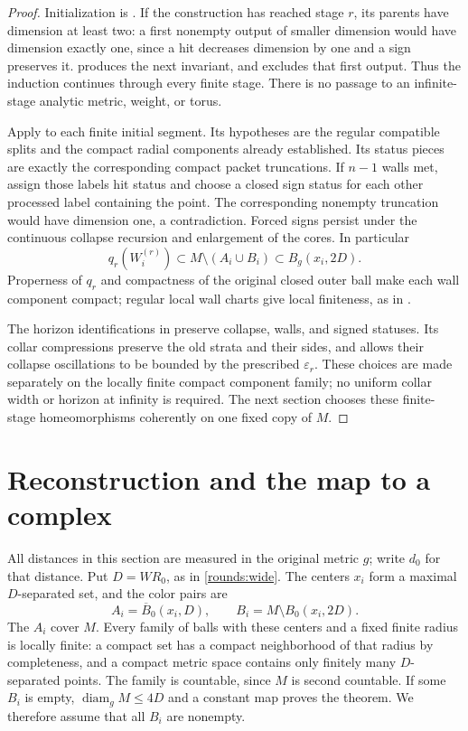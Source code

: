 \documentclass[11pt]{article}
\numberwithin{equation}{section}
\theoremstyle{definition}
\theoremstyle{remark}
\begin{document}
\begin{proof}
Initialization is . If the construction has
reached stage $r$, its parents have dimension at least two: a first
nonempty output of smaller dimension would have dimension exactly
one, since a hit decreases dimension by one and a sign preserves it.
 produces the next invariant, and
 excludes that first output. Thus the
induction continues through every finite stage. There is no passage
to an infinite-stage analytic metric, weight, or torus.

Apply  to each finite initial segment.
Its hypotheses are the regular compatible splits and the compact
radial components already established. Its status pieces are exactly
the corresponding compact packet truncations. If $n-1$ walls met,
assign those labels hit status and choose a closed sign status for
each other processed label containing the point. The corresponding
nonempty truncation would have dimension one, a contradiction.
Forced signs persist under the continuous collapse recursion and
enlargement of the cores. In particular
\[
 q_r(W_i^{(r)})\subset M\setminus(A_i\cup B_i)
                         \subset B_g(x_i,2D).
\]
Properness of $q_r$ and compactness of the original closed outer ball
make each wall component compact; regular local wall charts give
local finiteness, as in .

The horizon identifications in  preserve
collapse, walls, and signed statuses. Its collar compressions preserve
the old strata and their sides, and 
allows their collapse oscillations to be bounded by the prescribed
$\varepsilon_r$. These choices are made separately on the locally finite
compact component family; no uniform collar width or horizon at
infinity is required. The next section chooses these finite-stage
homeomorphisms coherently on one fixed copy of $M$.
\end{proof}

\section{Reconstruction and the map to a complex}\label{sec:reconstruction}

All distances in this section are measured in the original metric $g$;
write $d_0$ for that distance.  Put $D=WR_0$, as in
\cref{rounds:wide}.  The centers $x_i$ form a maximal $D$-separated set,
and the color pairs are
\[
 A_i=\overline B_0(x_i,D),\qquad
 B_i=M\setminus B_0(x_i,2D).
\]
The $A_i$ cover $M$.  Every family of balls with these centers and a
fixed finite radius is locally finite: a compact set has a compact
neighborhood of that radius by completeness, and a compact metric
space contains only finitely many $D$-separated points.  The family is
countable, since $M$ is second countable.  If some $B_i$ is empty,
$\operatorname{diam}_{g}M\le 4D$ and a constant map proves the theorem.  We therefore
assume that all $B_i$ are nonempty.
\end{document}
